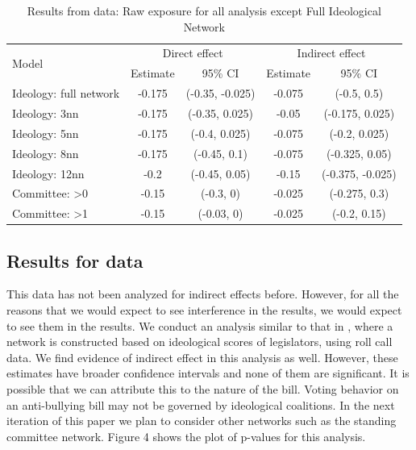 \documentclass[12pt]{article}
\begin{document}
\begin{table}[h]
\centering
\begin{tabular}{lcccc}
\toprule
\multirow{2}{*}{Model} & \multicolumn{2}{c}{Direct effect} & \multicolumn{2}{c}{Indirect effect} \\
\cmidrule(l){2-3} \cmidrule(l){4-5}
 & Estimate & 95\% CI & Estimate & 95\% CI \\
\midrule
Ideology: full network  & -0.175 & (-0.35, -0.025) & -0.075 & (-0.5, 0.5)\\
Ideology: 3nn & -0.175 & (-0.35, 0.025) & -0.05 & (-0.175, 0.025)\\
Ideology: 5nn & -0.175 & (-0.4, 0.025) & -0.075 & (-0.2, 0.025)\\
Ideology: 8nn & -0.175 & (-0.45, 0.1) & -0.075 & (-0.325, 0.05)\\
Ideology: 12nn & -0.2 &(-0.45,  0.05) & -0.15 & (-0.375, -0.025)\\
Committee: >0& -0.15 & (-0.3, 0) & -0.025 & (-0.275, 0.3)\\
Committee: >1 & -0.15 & (-0.03, 0) & -0.025 & (-0.2, 0.15)\\
\bottomrule
\end{tabular}
\caption{Results from \citet{coppock2014information} data: Raw exposure for all analysis except Full Ideological Network}
\end{table}


\subsection{Results for \citet{bergan2015call} data}

This data has not been analyzed for indirect effects before. However, for all the reasons that we would expect to see interference in the \citet{butler2011can} results, we would expect to see them in the \citet{bergan2015call} results. We conduct an analysis similar to that in \citet{coppock2014information}, where a network is constructed based on ideological scores of legislators, using roll call data. We find evidence of indirect effect in this analysis as well. However, these estimates have broader confidence intervals and none of them are significant. It is possible that we can attribute this to the nature of the bill. Voting behavior on an anti-bullying bill may not be governed by ideological coalitions. In the next iteration of this paper we plan to consider other networks such as the standing committee network. Figure 4 shows the plot of p-values for this analysis.
\end{document}
